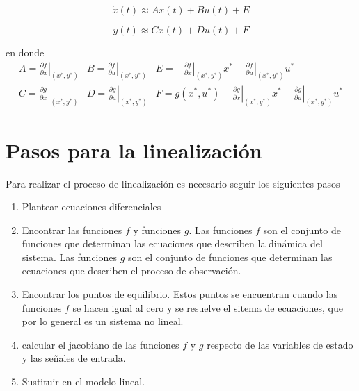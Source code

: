 \documentclass[12pt]{book}
\theoremstyle{definition}
\theoremstyle{remark}
\theoremstyle{plain}
\begin{document}
\begin{equation}
\label{equ233}
\dot{x}(t) \approx  A  x(t) +  B u(t)+ E
\end{equation}

\begin{equation}
\label{equ234}
y (t) \approx  C  x(t) +  D u(t)+ F
\end{equation}

en donde 
\begin{equation}
\label{equ235}
\begin{aligned}
A= \left . \frac{\partial f}{\partial x}  \right | _ {(x^*, y^*)}& B =  \left . \frac{\partial f}{\partial u}  \right |   _ {(x^*, y^*)} & E= - \left . \frac{\partial f}{\partial x}  \right | _ {(x^*, y^*)} x^*-\left . \frac{\partial f}{\partial u}  \right |   _ {(x^*, y^*)} u^*\\
C= \left . \frac{\partial g}{\partial x}  \right | _ {(x^*, y^*)}&  D =  \left . \frac{\partial g}{\partial u}  \right |   _ {(x^*, y^*)} & F=  g(x^*,u^*) -\left . \frac{\partial g}{\partial x}  \right | _ {(x^*, y^*)} x^*-\left . \frac{\partial g}{\partial u}  \right |   _ {(x^*, y^*)} u^*
\end{aligned}
\end{equation}

\section{Pasos para la linealización}
Para realizar el proceso de linealización es necesario seguir los siguientes pasos
\begin{enumerate}
\item Plantear ecuaciones diferenciales
\item Encontrar las funciones $f$ y funciones $g$. Las funciones $f$ son el conjunto de funciones que determinan las ecuaciones que describen la dinámica del sistema. Las funciones $g$ son el conjunto de funciones que determinan las ecuaciones que describen el proceso de observación.
\item Encontrar los puntos de equilibrio. Estos puntos se encuentran cuando las funciones $f$ se hacen igual al cero y se resuelve el sitema de ecuaciones, que por lo general es un sistema no lineal.
\item calcular el jacobiano de las funciones $f$ y $g$ respecto de las variables de estado y las señales de entrada.
\item Sustituir en el modelo lineal. 
\end{enumerate}
\end{document}
